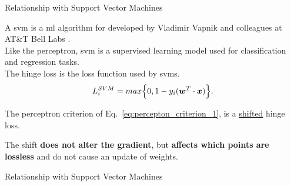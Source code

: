 \begin{frame}[t]{Relationship with Support Vector Machines}

    A \gls{svm} is a \gls{ml} algorithm for  
    developed by Vladimir Vapnik and colleagues at AT\&T Bell Labs 
    \cite{Vapnik:1995svm}\cite{Wikipedia:SVM}.\\

    Like the \gls{perceptron}, \gls{svm}
    is a \gls{supervised learning} model 
    used for \gls{classification} 
    and \gls{regression} tasks.\\

    The \gls{hinge loss} is 
    the \gls{loss function}
    used by \glspl{svm}. 
    \begin{equation}
        L_{i}^{SVM} = 
          max\Big\{0, 1 - y_i(\boldsymbol{w}^T \cdot \boldsymbol{x}) \Big\}.
        \label{eq:hinge_loss_1}  
    \end{equation}

    The \gls{perceptron criterion} 
    of Eq.~\ref{eq:percepton_criterion_1}, is a \underline{shifted} \gls{hinge loss}.

    The shift {\bf does not alter the gradient}, 
    but {\bf affects which points are lossless} and do not cause an update of weights.

\end{frame}

%
%
%

\begin{frame}[t]{Relationship with Support Vector Machines}

\end{frame}
